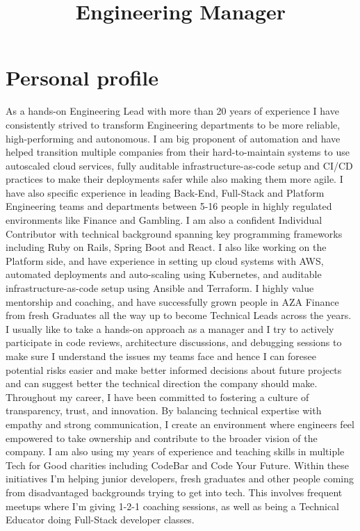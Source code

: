 \documentclass[10pt,a4paper,roman]{moderncv}
\title{Engineering Manager}
\begin{document}
\makecvtitle

\section{Personal profile}
As a hands-on Engineering Lead with more than 20 years of experience I have consistently strived to transform Engineering departments to be more reliable, high-performing and autonomous. I am big proponent of automation and have helped transition multiple companies from their hard-to-maintain systems to use autoscaled cloud services, fully auditable infrastructure-as-code setup and CI/CD practices to make their deployments safer while also making them more agile. I have also specific experience in leading Back-End, Full-Stack and Platform Engineering teams and departments between 5-16 people in highly regulated environments like Finance and Gambling.
\hfill\break
\hfill\break
I am also a confident Individual Contributor with technical background spanning key programming frameworks including Ruby on Rails, Spring Boot and React. I also like working on the Platform side, and have experience in setting up cloud systems with AWS, automated deployments and auto-scaling using Kubernetes, and auditable infrastructure-as-code setup using Ansible and Terraform.
\hfill\break
\hfill\break
I highly value mentorship and coaching, and have successfully grown people in AZA Finance from fresh Graduates all the way up to become Technical Leads across the years. I usually like to take a hands-on approach as a manager and I try to actively participate in code reviews, architecture discussions, and debugging sessions to make sure I understand the issues my teams face and hence I can foresee potential risks easier and make better informed decisions about future projects and can suggest better the technical direction the company should make.
\hfill\break
\hfill\break
Throughout my career, I have been committed to fostering a culture of transparency, trust, and innovation. By balancing technical expertise with empathy and strong communication, I create an environment where engineers feel empowered to take ownership and contribute to the broader vision of the company.
\hfill\break
\hfill\break
I am also using my years of experience and teaching skills in multiple Tech for Good charities including CodeBar and Code Your Future. Within these initiatives I'm helping junior developers, fresh graduates and other people coming from disadvantaged backgrounds trying to get into tech. This involves frequent meetups where I'm giving 1-2-1 coaching sessions, as well as being a Technical Educator doing Full-Stack developer classes.
\end{document}
